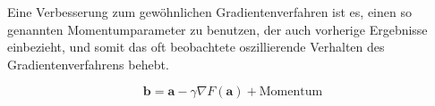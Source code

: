 Eine Verbesserung zum gewöhnlichen Gradientenverfahren ist es, einen so genannten Momentumparameter zu benutzen, der auch vorherige Ergebnisse einbezieht, und somit das oft beobachtete oszillierende Verhalten des Gradientenverfahrens behebt.

\begin{equation}
 \mathbf{b} = \mathbf{a}-\gamma\nabla F(\mathbf{a}) + \text{Momentum}
\end{equation}


